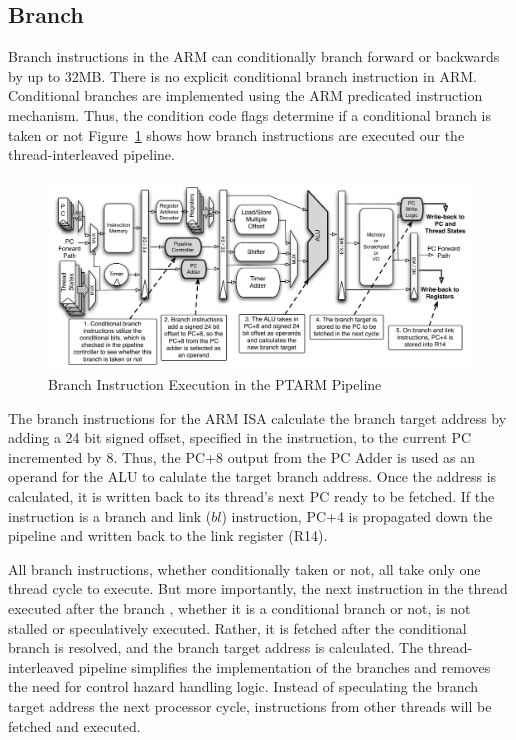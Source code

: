 \subsection{Branch}
Branch instructions in the ARM can conditionally branch forward or backwards by up to 32MB.
There is no explicit conditional branch instruction in ARM.
Conditional branches are implemented using the ARM predicated instruction mechanism.
Thus, the condition code flags determine if a conditional branch is taken or not 
Figure~\ref{fig:branch_pipeline_implementation} shows how branch instructions are executed our the thread-interleaved pipeline.

\begin{figure}[h]
  
  \begin{center}
    \includegraphics[scale=.54]{figs/branch_pipeline_implementation}
  \end{center}
  \vspace{-3mm}
  \caption{Branch Instruction Execution in the PTARM Pipeline}
  \label{fig:branch_pipeline_implementation}
\end{figure}

The branch instructions for the ARM ISA calculate the branch target address by adding a 24 bit signed offset, specified in the instruction, to the current PC incremented by 8. 
Thus, the PC+8 output from the PC Adder is used as an operand for the ALU to calulate the target branch address.  
Once the address is calculated, it is written back to its thread's next PC ready to be fetched. 
If the instruction is a branch and link ($bl$) instruction, PC+4 is propagated down the pipeline and written back to the link register (R14).   

All branch instructions, whether conditionally taken or not, all take only one thread cycle to execute.
But more importantly, the next instruction in the thread executed after the branch , whether it is a conditional branch or not, is not stalled or speculatively executed.
Rather, it is fetched after the conditional branch is resolved, and the branch target address is calculated. 
The thread-interleaved pipeline simplifies the implementation of the branches and removes the need for control hazard handling logic.
Instead of speculating the branch target address the next processor cycle, instructions from other threads will be fetched and executed.

